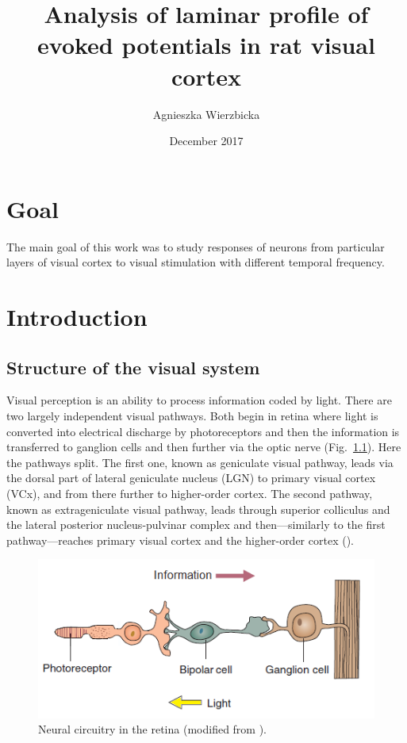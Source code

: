 \documentclass{pracalicmgr}
\author{Agnieszka Wierzbicka}
\title{Analysis of laminar profile of evoked potentials in rat visual cortex}
\date{December 2017}
\begin{document}
    \maketitle
    \let\cleardoublepage\clearpage
    
    \begin{abstract}


     \end{abstract}

  
    \tableofcontents
    
    \chapter*{Goal}
    The main goal of this work was to study responses of neurons from particular layers of visual cortex to visual stimulation with different temporal frequency.
    
   \chapter{Introduction}
   
   \section{Structure of the visual system}
   Visual perception is an ability to process information coded by light. There are two largely independent visual pathways. Both begin in retina where light is converted into electrical discharge by photoreceptors and then the information is transferred to ganglion cells and then further via the optic nerve (Fig.~\ref{rys:neural_circuitry}). Here the pathways split. The first one, known as geniculate visual pathway, leads via the dorsal part of lateral geniculate nucleus (LGN) to primary visual cortex (VCx), and from there further to higher-order cortex. The second pathway, known as extrageniculate visual pathway, leads through superior colliculus and the lateral posterior nucleus-pulvinar complex and then---similarly to the first pathway---reaches primary visual cortex and the higher-order cortex (\cite{viola, thomsonlayer6}). 
   \begin{figure}[htbp]
   	\begin{center}
   		\includegraphics[scale=0.9]{neural_circuitry.png}
   	\end{center}
   	\caption{Neural circuitry in the retina (modified from \cite{carlsonphysiology}).}
   	\label{rys:neural_circuitry}
   \end{figure}      
   
\end{document}
